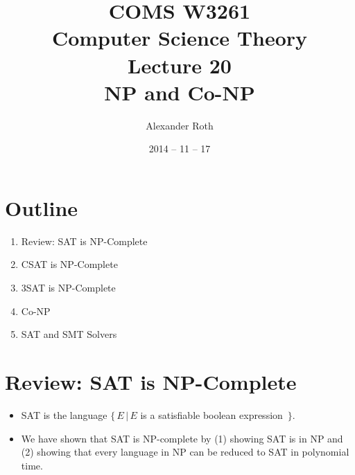 \documentclass[]{article}
\begin{document}
\newcommand*{\xml}[1]{\texttt{<#1>}}
\theoremstyle{definition}
\newtheorem{thm}{Theorem}
\title{COMS W3261 \\ Computer Science Theory \\ Lecture 20 \\ NP and Co-NP}
\author{Alexander Roth}
\date{2014 -- 11 -- 17}
\maketitle

\section*{Outline}
\begin{enumerate}
\item Review: SAT is NP-Complete
\item CSAT is NP-Complete
\item 3SAT is NP-Complete
\item Co-NP
\item SAT and SMT Solvers
\end{enumerate}

\section{Review: SAT is NP-Complete}
\begin{itemize}
\item SAT is the language $\{\,E\,|\,E$ is a satisfiable boolean expression
$\,\}$.
\item We have shown that SAT is NP-complete by (1) showing SAT is in NP and (2)
showing that every language in NP can be reduced to SAT in polynomial time.
\end{itemize}
\end{document}
